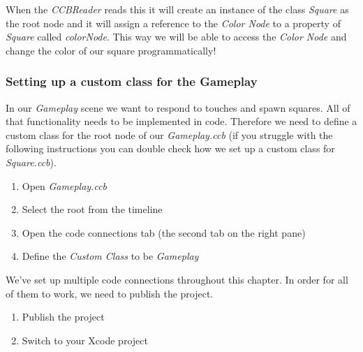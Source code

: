 When the \textit{CCBReader} reads this \ccbfile{} it will create an instance of
the class \textit{Square} as the root node and it will assign a reference to the
\textit{Color Node} to a property of \textit{Square} called
\textit{colorNode}. This way we will be able to access the \textit{Color Node}
and change the color of our square programmatically!

\subsubsection{Setting up a custom class for the Gameplay}
In our \textit{Gameplay} scene we want to respond to touches and spawn squares.
All of that functionality needs to be implemented in code. Therefore we need to
define a custom class for the root node of our \textit{Gameplay.ccb} (if you
struggle with the following instructions you can double check how we set up a
custom class for \textit{Square.ccb}).

\begin{leftbar}
\begin{enumerate}
  \item Open \textit{Gameplay.ccb}
  \item Select the root \ccnode{} from the timeline
  \item Open the code connections tab (the second tab on the right pane)
  \item Define the \textit{Custom Class} to be \textit{Gameplay}
\end{enumerate}
\end{leftbar}

We've set up multiple code connections throughout this chapter. In order for all
of them to work, we need to publish the \SB{} project. 

\begin{leftbar}
\begin{enumerate}
  \item Publish the \SB{} project
  \item Switch to your Xcode project
\end{enumerate}
\end{leftbar}

